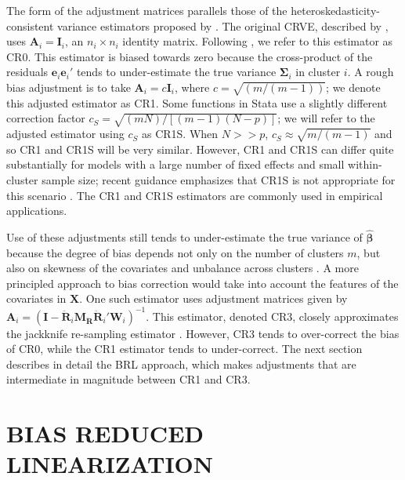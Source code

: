 \documentclass[12pt]{article}\usepackage[]{graphicx}\usepackage[]{color}
\newcommand{\bm}{\mathbf}
\newcommand{\bs}{\boldsymbol}
\begin{document}
The form of the adjustment matrices parallels those of the heteroskedasticity-consistent variance estimators proposed by \citet*{MacKinnon1985some}. 
The original CRVE, described by \citet{Liang1986longitudinal}, uses $\bm{A}_i = \bm{I}_i$, an $n_i \times n_i$ identity matrix. 
Following \citet{Cameron2015practitioners}, we refer to this estimator as CR0. 
This estimator is biased towards zero because the cross-product of the residuals $\bm{e}_i \bm{e}_i'$ tends to under-estimate the true variance $\bs\Sigma_i$ in cluster $i$.
A rough bias adjustment is to take $\bm{A}_i = c\bm{I}_i$, where $c = \sqrt{(m/(m-1))}$; we denote this adjusted estimator as CR1. Some functions in Stata use a slightly different correction factor $c_S = \sqrt{(m N)/[(m - 1)(N - p)]}$; we will refer to the adjusted estimator using $c_S$ as CR1S. When $N >> p$, $c_S \approx \sqrt{m/(m-1)}$ and so CR1 and CR1S will be very similar. 
However, CR1 and CR1S can differ quite substantially for models with a large number of fixed effects and small within-cluster sample size; recent guidance emphasizes that CR1S is not appropriate for this scenario \citep{Cameron2015practitioners}.
The CR1 and CR1S estimators are commonly used in empirical applications.

Use of these adjustments still tends to under-estimate the true variance of $\hat{\bs\beta}$ because the degree of bias depends not only on the number of clusters $m$, but also on skewness of the covariates and unbalance across clusters \citep{Carter2013asymptotic, MacKinnon2013thirty, Cameron2015practitioners, Young2016improved}. 
A more principled approach to bias correction would take into account the features of the covariates in $\bm{X}$. 
One such estimator uses adjustment matrices given by $\bm{A}_i = \left(\bm{I} - \bm{\ddot{R}}_i \bm{M_{\ddot{R}}}\bm{\ddot{R}}_i'\bm{W}_i\right)^{-1}$. This estimator, denoted CR3, closely approximates the jackknife re-sampling estimator \citep{Bell2002bias, Mancl2001covariance}.  
However, CR3 tends to over-correct the bias of CR0, while the CR1 estimator tends to under-correct. 
The next section describes in detail the BRL approach, which makes adjustments that are intermediate in magnitude between CR1 and CR3. 


\section{BIAS REDUCED LINEARIZATION}
\label{sec:BRL}
\end{document}

